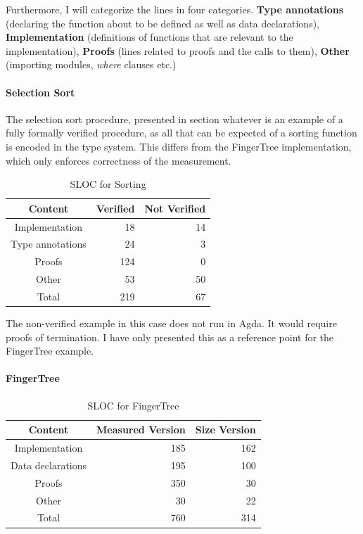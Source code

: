 \documentclass[12pt,twoside,notitlepage]{report}
\begin{document}
Furthermore, I will categorize the lines in four categories. \textbf{Type annotations} (declaring the function about to be defined as well as data declarations), \textbf{Implementation} (definitions of functions that are relevant to the implementation), \textbf{Proofs} (lines related to proofs and the calls to them), \textbf{Other} (importing modules, \textit{where} clauses etc.)
  
\paragraph{Selection Sort}

The selection sort procedure, presented in section whatever is an example of a fully formally verified procedure, as all that can be expected of a sorting function is encoded in the type system. This differs from the FingerTree implementation, which only enforces correctness of the measurement.

\begin{table}[H]
\caption{SLOC for Sorting}
\center
\begin{tabular}{c r r}
\hline
Content & Verified & Not Verified\\
\hline
Implementation & 18 & 14 \\
Type annotations & 24 & 3 \\
Proofs & 124 & 0 \\
Other & 53 & 50 \\
Total & 219 & 67 \\
\hline
\end{tabular} 
\end{table}

The non-verified example in this case does not run in Agda. It would require proofs of termination. I have only presented this as a reference point for the FingerTree example.

\paragraph{FingerTree}

\begin{table}[H]
\caption{SLOC for FingerTree}
\center
\begin{tabular}{c r r}
\hline 
Content & Measured Version & Size Version \\
\hline
Implementation & 185 & 162 \\ 
Data declarations & 195 & 100 \\
Proofs & 350 & 30 \\
Other & 30 & 22 \\ 
Total & 760 & 314 \\
\hline
\end{tabular}
\end{table} 
\end{document}
